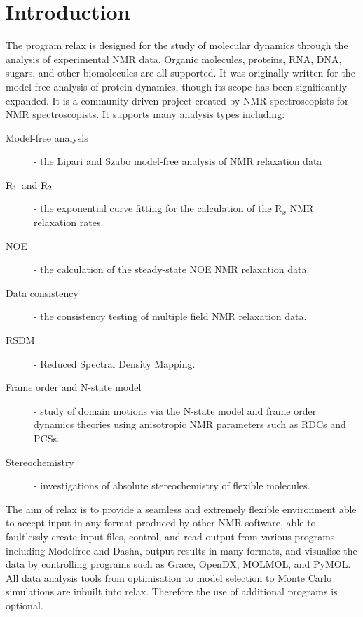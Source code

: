
\chapter{Introduction}

The program relax is designed for the study of molecular dynamics through the analysis of experimental NMR data. Organic molecules, proteins, RNA, DNA, sugars, and other biomolecules are all supported. It was originally written for the model-free analysis of protein dynamics, though its scope has been significantly expanded.  It is a community driven project created by NMR spectroscopists for NMR spectroscopists.  It supports many analysis types including:

\begin{description}
\item[Model-free analysis] - the Lipari and Szabo model-free analysis of NMR relaxation data
\item[$\mathrm{R}_1$ and $\mathrm{R}_2$] - the exponential curve fitting for the calculation of the R$_x$ NMR relaxation rates.
\item[NOE] - the calculation of the steady-state NOE NMR relaxation data.
\item[Data consistency] - the consistency testing of multiple field NMR relaxation data.
\item[RSDM] - Reduced Spectral Density Mapping.
\item[Frame order and N-state model] - study of domain motions via the N-state model and frame order dynamics theories using anisotropic NMR parameters such as RDCs and PCSs.
\item[Stereochemistry] - investigations of absolute stereochemistry of flexible molecules.
\end{description}

The aim of relax is to provide a seamless and extremely flexible environment able to accept input in any format produced by other NMR software, able to faultlessly create input files, control, and read output from various programs including Modelfree and Dasha, output results in many formats, and visualise the data by controlling programs such as Grace, OpenDX, MOLMOL, and PyMOL.  All data analysis tools from optimisation to model selection to Monte Carlo simulations are inbuilt into relax. Therefore the use of additional programs is optional.

